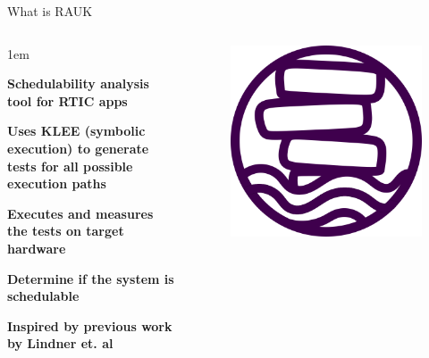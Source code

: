 \begin{frame}{What is RAUK}
    \begin{columns}
        \begin{itemize-size}{1em}
            \item \textbf{Schedulability analysis tool for RTIC apps}
            \item \textbf{Uses KLEE (symbolic execution) to generate tests for
                all possible execution paths}
            \item \textbf{Executes and measures the tests on target hardware}
            \item \textbf{Determine if the system is schedulable}
            \item \textbf{Inspired by previous work by Lindner et. al\footnotemark}
        \end{itemize-size}

        \begin{figure}
            \centering
            \includegraphics[scale=0.25]{pictures/RAUK.png}
        \end{figure}
    \end{columns}
\end{frame}

